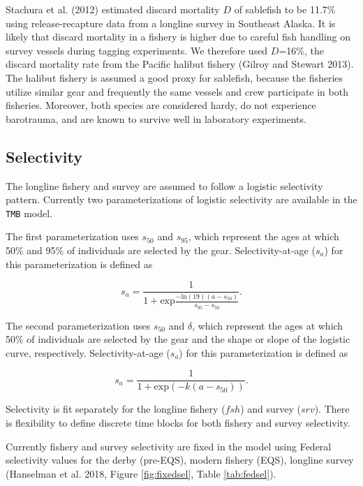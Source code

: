 \documentclass[]{article}
\begin{document}
Stachura et al. (2012) estimated discard mortality \(D\) of sablefish to
be 11.7\% using release-recapture data from a longline survey in
Southeast Alaska. It is likely that discard mortality in a fishery is
higher due to careful fish handling on survey vessels during tagging
experiments. We therefore used \(D\)=16\%, the discard mortality rate
from the Pacific halibut fishery (Gilroy and Stewart 2013). The halibut
fishery is assumed a good proxy for sablefish, because the fisheries
utilize similar gear and frequently the same vessels and crew
participate in both fisheries. Moreover, both species are considered
hardy, do not experience barotrauma, and are known to survive well in
laboratory experiments.

\subsection{Selectivity}\label{selectivity}

The longline fishery and survey are assumed to follow a logistic
selectivity pattern. Currently two parameterizations of logistic
selectivity are available in the \texttt{TMB} model.

The first parameterization uses \(s_{50}\) and \(s_{95}\), which
represent the ages at which 50\% and 95\% of individuals are selected by
the gear. Selectivity-at-age (\(s_a\)) for this parameterization is
defined as

\begin{equation}
s_a=\frac{1}{1+\mbox{exp}\frac{-\mbox{ln}(19)(a-s_{50})}{s_{95}-s_{50}}}.
\label{eq:sel1}
\end{equation}

The second parameterization uses \(s_{50}\) and \(\delta\), which
represent the ages at which 50\% of individuals are selected by the gear
and the shape or slope of the logistic curve, respectively.
Selectivity-at-age (\(s_a\)) for this parameterization is defined as

\begin{equation}
s_a=\frac{1}{1+\mbox{exp}(-k(a-s_{50}))}.
\label{eq:sel2}
\end{equation}

Selectivity is fit separately for the longline fishery (\(fsh\)) and
survey (\(srv\)). There is flexibility to define discrete time blocks
for both fishery and survey selectivity.

Currently fishery and survey selectivity are fixed in the model using
Federal selectivity values for the derby (pre-EQS), modern fishery
(EQS), longline survey (Hanselman et al. 2018, Figure
\ref{fig:fixedsel}, Table \ref{tab:fedsel}).
\end{document}
